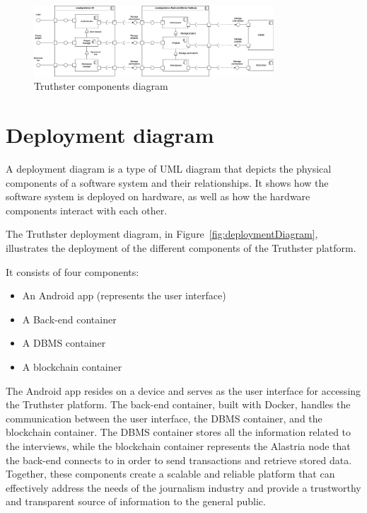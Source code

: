 \documentclass[target=mst,aauheader=]{thud}
\begin{document}
\begin{figure}
    \centering
    \includegraphics[width=0.8\textwidth]{images/componentDiagram.png}
    \caption{Truthster components diagram}
    \label{fig:componentDiagram}
\end{figure}

\section{Deployment diagram}

A deployment diagram is a type of UML diagram that depicts the physical components of a software system and their relationships. It shows how the software system is deployed on hardware, as well as how the hardware components interact with each other.

The Truthster deployment diagram, in Figure~\ref{fig:deploymentDiagram}, illustrates the deployment of the different components of the Truthster platform.\par
It consists of four components: 

    \begin{itemize}

        \item An Android app (represents the user interface)
        \item A Back-end container
        \item A DBMS container
        \item A blockchain container

    \end{itemize} 

The Android app resides on a device and serves as the user interface for accessing the Truthster platform. The back-end container, built with Docker, handles the communication between the user interface, the DBMS container, and the blockchain container. The DBMS container stores all the information related to the interviews, while the blockchain container represents the Alastria node that the back-end connects to in order to send transactions and retrieve stored data. Together, these components create a scalable and reliable platform that can effectively address the needs of the journalism industry and provide a trustworthy and transparent source of information to the general public.
\end{document}
